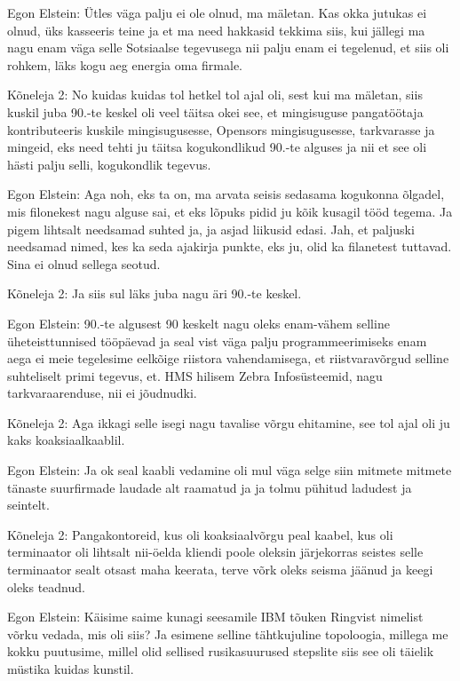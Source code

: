 Egon Elstein:
Ütles väga palju ei ole olnud, ma mäletan.
Kas okka jutukas ei olnud, üks kasseeris teine ja et ma need hakkasid tekkima siis, kui jällegi ma nagu enam väga selle
Sotsiaalse tegevusega nii palju enam ei tegelenud, et siis oli rohkem, läks kogu aeg energia oma firmale.
                 
Kõneleja 2:
No kuidas kuidas tol hetkel tol ajal oli, sest kui ma mäletan, siis kuskil juba 90.-te keskel oli veel täitsa okei see, et mingisuguse pangatöötaja kontributeeris kuskile mingisugusesse, Opensors mingisugusesse, tarkvarasse ja mingeid, eks need tehti ju täitsa kogukondlikud 90.-te alguses ja nii et see oli hästi palju selli, kogukondlik tegevus.
                 
Egon Elstein:
Aga noh, eks ta on, ma arvata seisis sedasama kogukonna õlgadel, mis filonekest nagu alguse sai, et eks lõpuks pidid ju kõik kusagil tööd tegema. Ja pigem lihtsalt needsamad suhted ja, ja asjad liikusid edasi.
Jah, et paljuski needsamad nimed, kes ka seda ajakirja punkte, eks ju, olid ka filanetest tuttavad. Sina ei olnud sellega seotud.
                 
Kõneleja 2:
Ja siis sul läks juba nagu äri 90.-te keskel.
                 
Egon Elstein:
90.-te algusest 90 keskelt nagu oleks enam-vähem selline üheteisttunnised tööpäevad ja seal vist väga palju programmeerimiseks enam aega ei meie tegelesime eelkõige riistora vahendamisega, et riistvaravõrgud selline suhteliselt primi tegevus, et.
HMS hilisem Zebra Infosüsteemid, nagu tarkvaraarenduse, nii ei jõudnudki.
                 
Kõneleja 2:
Aga ikkagi selle isegi nagu tavalise võrgu ehitamine, see tol ajal oli ju kaks koaksiaalkaablil.
                 
Egon Elstein:
Ja ok seal kaabli vedamine oli mul väga selge siin mitmete mitmete tänaste suurfirmade laudade alt raamatud ja ja tolmu pühitud ladudest ja seintelt.
                 
Kõneleja 2:
Pangakontoreid, kus oli koaksiaalvõrgu peal kaabel, kus oli terminaator oli lihtsalt nii-öelda kliendi poole oleksin järjekorras seistes selle terminaator sealt otsast maha keerata, terve võrk oleks seisma jäänud ja keegi oleks teadnud.
                 
Egon Elstein:
Käisime saime kunagi seesamile IBM tõuken Ringvist nimelist võrku vedada, mis oli siis?
Ja esimene selline tähtkujuline topoloogia, millega me kokku puutusime, millel olid sellised rusikasuurused stepslite siis see oli täielik müstika kuidas kunstil.
                 
